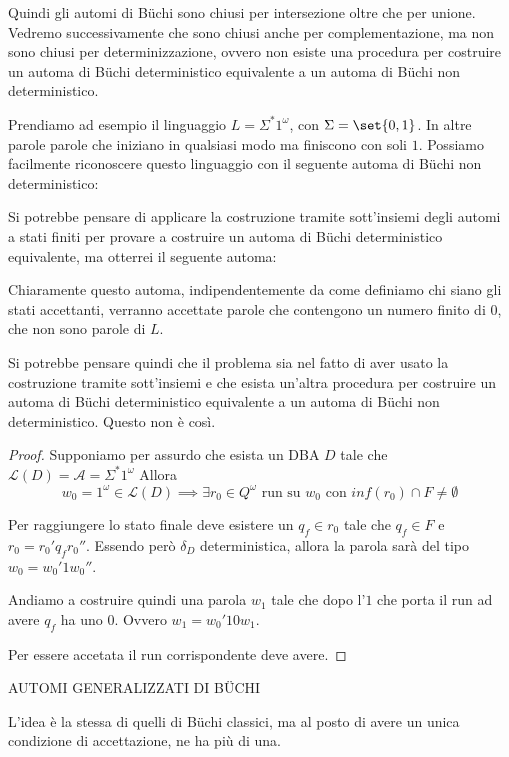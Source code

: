Quindi gli automi di Büchi sono chiusi per intersezione oltre che per unione. Vedremo successivamente che sono chiusi anche per complementazione, ma non sono chiusi per determinizzazione, ovvero non esiste una procedura per costruire un automa di Büchi deterministico equivalente a un automa di Büchi non deterministico.

Prendiamo ad esempio il linguaggio \(L = \Sigma^* 1^\omega\), con \(\Sigma= \set{0,1}\). In altre parole parole che iniziano in qualsiasi modo ma finiscono con soli \(1\). Possiamo facilmente riconoscere questo linguaggio con il seguente automa di Büchi non deterministico:

Si potrebbe pensare di applicare la costruzione tramite sott'insiemi degli automi a stati finiti per provare a costruire un automa di Büchi deterministico equivalente, ma otterrei il seguente automa:

Chiaramente questo automa, indipendentemente da come definiamo chi siano gli stati accettanti, verranno accettate parole che contengono un numero finito di \(0\), che non sono parole di \(L\).

Si potrebbe pensare quindi che il problema sia nel fatto di aver usato la costruzione tramite sott'insiemi e che esista un'altra procedura per costruire un automa di Büchi deterministico equivalente a un automa di Büchi non deterministico. Questo non è così.

\begin{proof}
  Supponiamo per assurdo che esista un DBA \(D\) tale che \(\mathcal{L}(D)=\mathcal{A} = \Sigma^* 1^\omega\)
  Allora
  \[w_0 = 1^\omega \in \mathcal{L}(D) \implies \exists r_0 \in Q^\omega \text{ run su } w_0 \text{ con } inf(r_0) \cap F \neq \emptyset\]

  Per raggiungere lo stato finale deve esistere un \(q_f \in r_0\) tale che \(q_f \in F\) e \(r_0=r_0' q_f r_0''\).
  Essendo però \(\delta_D\) deterministica, allora la parola sarà del tipo \(w_0=w_0'1w_0''\).

  Andiamo a costruire quindi una parola \(w_1\) tale che dopo l'\(1\) che porta il run ad avere \(q_f\) ha uno \(0\). Ovvero \(w_1 = w_0' 1 0 w_1\).

  Per essere accetata il run corrispondente deve avere.
\end{proof}

AUTOMI GENERALIZZATI DI BÜCHI

L'idea è la stessa di quelli di Büchi classici, ma al posto di avere un unica condizione di accettazione, ne ha più di una.

